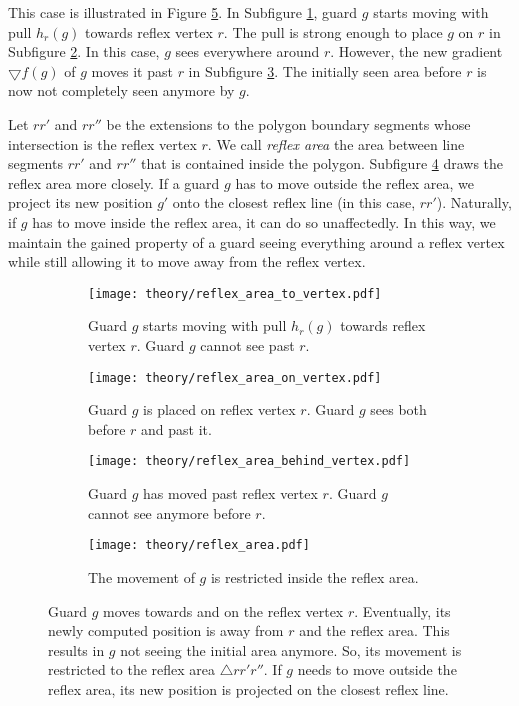 This case is illustrated in Figure \ref{fig:pull_to_on_behind}. In Subfigure \ref{fig:pull_to_on_behind1}, guard $g$ starts moving with pull $h_r(g)$ towards reflex vertex $r$. The pull is strong enough to place $g$ on $r$ in Subfigure \ref{fig:pull_to_on_behind2}. In this case, $g$ sees everywhere around $r$. However, the new gradient $\bigtriangledown f(g)$ of $g$ moves it past $r$ in Subfigure \ref{fig:pull_to_on_behind3}. The initially seen area before $r$ is now not completely seen anymore by $g$.

Let $rr'$ and $rr''$ be the extensions to the polygon boundary segments whose intersection is the reflex vertex $r$. We call \textit{reflex area} the area between line segments $rr'$ and $rr''$ that is contained inside the polygon. Subfigure \ref{fig:reflex_area} draws the reflex area more closely. If a guard $g$ has to move outside the reflex area, we project its new position $g'$ onto the closest reflex line (in this case, $rr'$). Naturally, if $g$ has to move inside the reflex area, it can do so unaffectedly. In this way, we maintain the gained property of a guard seeing everything around a reflex vertex while still allowing it to move away from the reflex vertex.

\begin{figure}[h!]
    \centering
    \begin{subfigure}{0.45\textwidth}
        \texttt{[image: theory/reflex\_area\_to\_vertex.pdf]}
        \caption{Guard $g$ starts moving with pull $h_r(g)$ towards reflex vertex $r$. Guard $g$ cannot see past $r$.}
        \label{fig:pull_to_on_behind1}
    \end{subfigure}
    \hfill
    \begin{subfigure}{0.45\textwidth}
        \texttt{[image: theory/reflex\_area\_on\_vertex.pdf]}
        \caption{Guard $g$ is placed on reflex vertex $r$. Guard $g$ sees both before $r$ and past it.}
        \label{fig:pull_to_on_behind2}
    \end{subfigure}
    \begin{subfigure}{0.45\textwidth}
        \texttt{[image: theory/reflex\_area\_behind\_vertex.pdf]}
        \caption{Guard $g$ has moved past reflex vertex $r$. Guard $g$ cannot see anymore before $r$.}
        \label{fig:pull_to_on_behind3}
    \end{subfigure}
    \hfill
    \begin{subfigure}{0.45\textwidth}
        \texttt{[image: theory/reflex\_area.pdf]}
        \caption{The movement of $g$ is restricted inside the reflex area.}
        \label{fig:reflex_area}
    \end{subfigure}
    \caption{Guard $g$ moves towards and on the reflex vertex $r$. Eventually, its newly computed position is away from $r$ and the reflex area. This results in $g$ not seeing the initial area anymore. So, its movement is restricted to the reflex area $\triangle rr'r''$. If $g$ needs to move outside the reflex area, its new position is projected on the closest reflex line.}
    \label{fig:pull_to_on_behind}
\end{figure}

